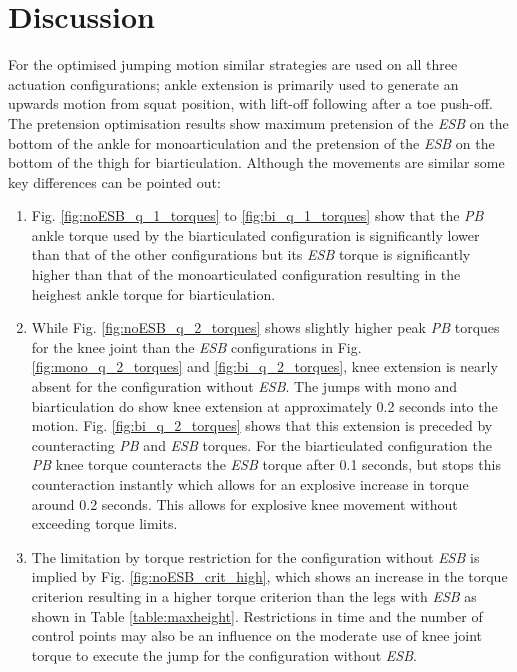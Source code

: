 \documentclass[letterpaper, 10 pt, conference]{ieeeconf}  %
\begin{document}
\section{Discussion} \label{sec:discussion}

For the optimised jumping motion similar strategies are used on all three actuation configurations; ankle extension is primarily used to generate an upwards motion from squat position, with lift-off following after a toe push-off. The pretension optimisation results show maximum pretension of the \textit{ESB} on the bottom of the ankle for monoarticulation and the pretension of the \textit{ESB} on the bottom of the thigh for biarticulation. Although the movements are similar some key differences can be pointed out:

\begin{enumerate}
	\item Fig. \ref{fig:noESB_q_1_torques} to \ref{fig:bi_q_1_torques} show that the \textit{PB} ankle torque used by the biarticulated configuration is significantly lower than that of the other configurations but its \textit{ESB} torque is significantly higher than that of the monoarticulated configuration resulting in the heighest ankle torque for biarticulation. 
	
	\item While Fig. \ref{fig:noESB_q_2_torques} shows slightly higher peak \textit{PB} torques for the knee joint than the \textit{ESB} configurations in Fig. \ref{fig:mono_q_2_torques} and \ref{fig:bi_q_2_torques}, knee extension is nearly absent for the configuration without \textit{ESB}. The jumps with mono and biarticulation do show knee extension at approximately 0.2 seconds into the motion. Fig. \ref{fig:bi_q_2_torques} shows that this extension is preceded by counteracting \textit{PB} and \textit{ESB} torques. For the biarticulated configuration the \textit{PB} knee torque counteracts the \textit{ESB} torque after 0.1 seconds, but stops this counteraction instantly which allows for an explosive increase in torque around 0.2 seconds. This allows for explosive knee movement without exceeding torque limits.
	
	\item The limitation by torque restriction for the configuration without \textit{ESB} is implied by Fig. \ref{fig:noESB_crit_high}, which shows an increase in the torque criterion resulting in a higher torque criterion than the legs with \textit{ESB} as shown in Table \ref{table:maxheight}. Restrictions in time and the number of control points may also be an influence on the moderate use of knee joint torque to execute the jump for the configuration without \textit{ESB}.
	

\end{enumerate}
\end{document}
